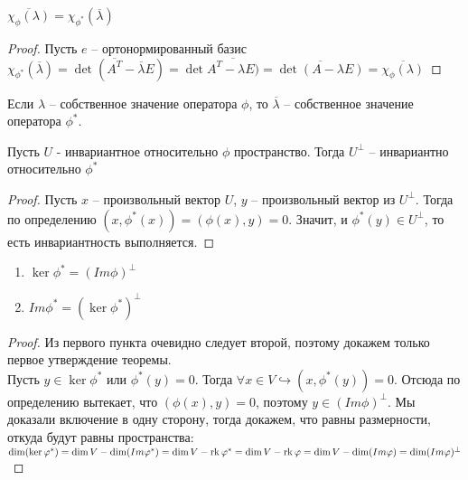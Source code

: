 \begin{corollary}
    $\overline{\chi_{\phi} (\lambda)} = \chi_{\phi^*}(\overline{\lambda})$
\end{corollary}

\begin{proof}
    Пусть $e$ -- ортонормированный базис $\chi_{\phi^*}(\overline{\lambda}) = \det(\overline{A^T} - \overline{\lambda} E) = \det \overline{A^T - \lambda E)} = \overline{\det(A - \lambda E)} = \overline{\chi_{\phi} (\lambda)}$
\end{proof}

\begin{corollary}
    Если $\lambda$ -- собственное значение оператора $\phi$, то $\overline{\lambda}$ -- собственное значение оператора $\phi^*$.
\end{corollary}

\begin{proposition}
    Пусть $U$ - инвариантное относительно $\phi$ пространство. Тогда $U^{\perp}$ -- инвариантно относительно $\phi^*$
\end{proposition}

\begin{proof}
    Пусть $x$ -- произвольный вектор $U$, $y$ -- произвольный вектор из $U^{\perp}$. Тогда по определению $(x, \phi^*(x)) = (\phi(x), y) = 0$. Значит, и $\phi^*(y) \in U^{\perp}$, то есть инвариантность выполняется.
\end{proof}

\begin{theorem}[Фредгольм]
    \begin{enumerate}
        \item $\ker \phi^* = (Im \phi)^{\perp}$
        \item $Im \phi^* = (\ker \phi^*)^{\perp}$
    \end{enumerate}
\end{theorem}

\begin{proof}
    Из первого пункта очевидно следует второй, поэтому докажем только первое утверждение теоремы. \\
    Пусть $y \in \ker \phi^*$ или $\phi^*(y) = 0$. Тогда $\forall x \in V \hookrightarrow (x, \phi^*(y)) = 0$. Отсюда по определению вытекает, что $(\phi(x), y) = 0$, поэтому $y \in (Im \phi)^{\perp}$. Мы доказали включение в одну сторону, тогда докажем, что равны размерности, откуда будут равны пространства: $\dim(\ker \varphi^*) = \dim V - \dim(Im \varphi^*) = \dim V - \operatorname{rk} \varphi^* = \dim V - \operatorname{rk} \varphi = \dim V - \dim (Im \varphi) = \dim (Im \varphi)^{\perp}$
\end{proof}

